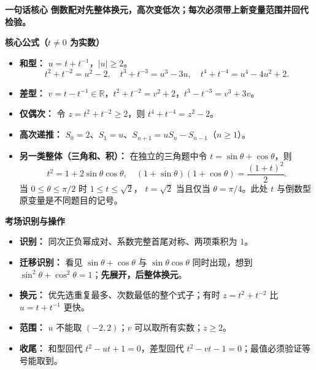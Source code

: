 \clearpage
\begin{summarybox}
    \textbf{\textcolor{CSummary}{一句话核心}}
    \textbf{倒数配对先整体换元，高次变低次；每次必须带上新变量范围并回代检验。}

    \medskip
    \textbf{\textcolor{CSummary}{核心公式（$t\ne0$ 为实数）}}
    \begin{itemize}[leftmargin=*, itemsep=0.52em, topsep=0.35em]
      \item \textbf{和型：} $u=t+t^{-1}$，$|u|\ge2$。
        \[
          t^2+t^{-2}=u^2-2,\quad
          t^3+t^{-3}=u^3-3u,\quad
          t^4+t^{-4}=u^4-4u^2+2.
        \]
      \item \textbf{差型：} $v=t-t^{-1}\in\mathbb R$，$t^2+t^{-2}=v^2+2$，$t^3-t^{-3}=v^3+3v$。
      \item \textbf{仅偶次：} 令 $z=t^2+t^{-2}\ge2$，则 $t^4+t^{-4}=z^2-2$。
      \item \textbf{高次递推：} $S_0=2$、$S_1=u$、$S_{n+1}=uS_n-S_{n-1}$（$n\ge1$）。
      \item \textbf{另一类整体（三角和、积）：} 在独立的三角题中令
        $t=\sin\theta+\cos\theta$，则
        \[
        t^2=1+2\sin\theta\cos\theta,\quad
        (1+\sin\theta)(1+\cos\theta)=\frac{(1+t)^2}{2}.
        \]
        当 $0\le\theta\le\pi/2$ 时 $1\le t\le\sqrt2$，
        $t=\sqrt2$ 当且仅当 $\theta=\pi/4$。此处 $t$ 与倒数型原变量是不同题目的记号。
    \end{itemize}

    \medskip
    \textbf{\textcolor{CSummary}{考场识别与操作}}
    \begin{itemize}[leftmargin=*, itemsep=0.46em, topsep=0.35em]
      \item \textbf{识别：} 同次正负幂成对、系数完整首尾对称、两项乘积为 $1$。
      \item \textbf{迁移识别：} 看见 $\sin\theta+\cos\theta$ 与
        $\sin\theta\cos\theta$ 同时出现，想到
        $\sin^2\theta+\cos^2\theta=1$；\textbf{先展开，后整体换元}。
      \item \textbf{换元：} 优先选重复最多、次数最低的整个式子；有时 $z=t^2+t^{-2}$ 比 $u=t+t^{-1}$ 更快。
      \item \textbf{范围：} $u$ 不能取 $(-2,2)$；$v$ 可以取所有实数；$z\ge2$。
      \item \textbf{收尾：} 和型回代 $t^2-ut+1=0$，差型回代 $t^2-vt-1=0$；最值必须验证等号能取到。
    \end{itemize}


\end{summarybox}
